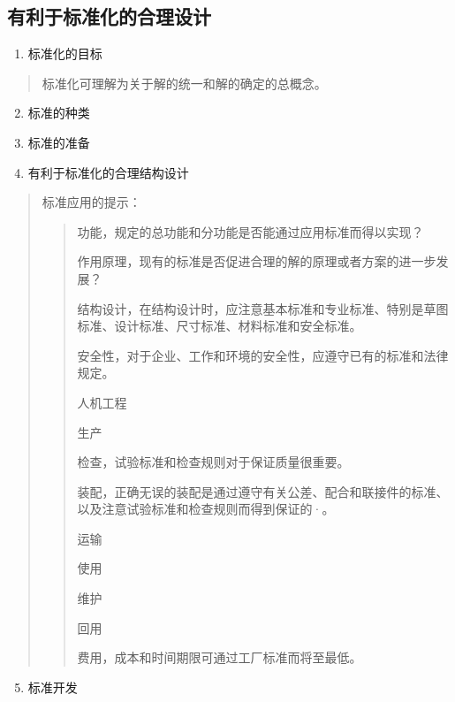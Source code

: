 \documentclass[letterpaper,10pt,english]{sphinxmanual}
\begin{document}
\subsection{有利于标准化的合理设计}
\label{unit6:id22}\begin{enumerate}
\item {} 
标准化的目标

\end{enumerate}
\begin{quote}

标准化可理解为关于解的统一和解的确定的总概念。
\end{quote}
\begin{enumerate}
\setcounter{enumi}{1}
\item {} 
标准的种类

\item {} 
标准的准备

\item {} 
有利于标准化的合理结构设计

\end{enumerate}
\begin{quote}

标准应用的提示：
\begin{quote}

功能，规定的总功能和分功能是否能通过应用标准而得以实现？

作用原理，现有的标准是否促进合理的解的原理或者方案的进一步发展？

结构设计，在结构设计时，应注意基本标准和专业标准、特别是草图标准、设计标准、尺寸标准、材料标准和安全标准。

安全性，对于企业、工作和环境的安全性，应遵守已有的标准和法律规定。

人机工程

生产

检查，试验标准和检查规则对于保证质量很重要。

装配，正确无误的装配是通过遵守有关公差、配合和联接件的标准、以及注意试验标准和检查规则而得到保证的·。

运输

使用

维护

回用

费用，成本和时间期限可通过工厂标准而将至最低。
\end{quote}
\end{quote}
\begin{enumerate}
\setcounter{enumi}{4}
\item {} 
标准开发

\end{enumerate}
\end{document}
